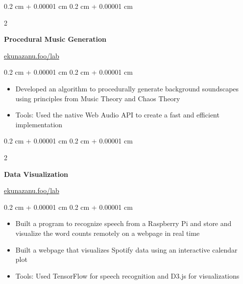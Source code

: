 \documentclass[10pt, a4paper]{article}
\newenvironment{highlights}{
    \begin{itemize}[
        topsep=0.10 cm,
        parsep=0.10 cm,
        partopsep=0pt,
        itemsep=0pt,
        leftmargin=0.4 cm + 10pt
    ]
}{
    \end{itemize}
} %
\newenvironment{onecolentry}{
    \begin{adjustwidth}{
        0.2 cm + 0.00001 cm
    }{
        0.2 cm + 0.00001 cm
    }
}{
    \end{adjustwidth}
} %
\newenvironment{twocolentry}[2][]{
    \onecolentry
    \def\secondColumn{#2}
    \setcolumnwidth{\fill, 4.5 cm}
    \begin{paracol}{2}
}{
    \switchcolumn \raggedleft \secondColumn
    \end{paracol}
    \endonecolentry
} %
\begin{document}
        \vspace{0.2 cm}

        \begin{twocolentry}{
        \href{https://ekunazanu.foo/lab/procedural-soundscapes}{ekunazanu.foo/lab}}
            \textbf{Procedural Music Generation}
        \end{twocolentry}
        \vspace{0.10 cm}
        \begin{onecolentry}
            \begin{highlights}
                \item Developed an algorithm to procedurally generate background soundscapes using principles from Music Theory and Chaos Theory
                \item Tools: Used the native Web Audio API to create a fast and efficient implementation
            \end{highlights}
        \end{onecolentry}

        \vspace{0.2 cm}

        \begin{twocolentry}{
        \href{https://ekunazanu.foo/lab/free-speech}{ekunazanu.foo/lab}}
            \textbf{Data Visualization}
        \end{twocolentry}
        \vspace{0.10 cm}
        \begin{onecolentry}
            \begin{highlights}
                \item Built a program to recognize speech from a Raspberry Pi and store and visualize the word counts remotely on a webpage in real time
                \item Built a webpage that visualizes Spotify data using an interactive calendar plot
                \item Tools: Used TensorFlow for speech recognition and D3.js for visualizations
            \end{highlights}
        \end{onecolentry}

        
\end{document}
